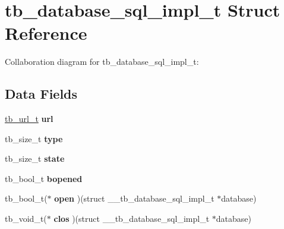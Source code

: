 \hypertarget{structtb__database__sql__impl__t}{\section{tb\-\_\-database\-\_\-sql\-\_\-impl\-\_\-t Struct Reference}
\label{structtb__database__sql__impl__t}
}


Collaboration diagram for tb\-\_\-database\-\_\-sql\-\_\-impl\-\_\-t\-:
\subsection*{Data Fields}
\begin{DoxyCompactItemize}
\item 
\hypertarget{structtb__database__sql__impl__t_acbc34a4600fe6223cdf4aa08bb3df7ce}{\hyperlink{structtb__url__t}{tb\-\_\-url\-\_\-t} {\bfseries url}}\label{structtb__database__sql__impl__t_acbc34a4600fe6223cdf4aa08bb3df7ce}

\item 
\hypertarget{structtb__database__sql__impl__t_ac3a776c88e0ed0d1ba9ca92743af5d33}{tb\-\_\-size\-\_\-t {\bfseries type}}\label{structtb__database__sql__impl__t_ac3a776c88e0ed0d1ba9ca92743af5d33}

\item 
\hypertarget{structtb__database__sql__impl__t_ad51a1819a391ff588ae2350f78cd7946}{tb\-\_\-size\-\_\-t {\bfseries state}}\label{structtb__database__sql__impl__t_ad51a1819a391ff588ae2350f78cd7946}

\item 
\hypertarget{structtb__database__sql__impl__t_ac13557c348a2c60c2f135dbca17615bc}{tb\-\_\-bool\-\_\-t {\bfseries bopened}}\label{structtb__database__sql__impl__t_ac13557c348a2c60c2f135dbca17615bc}

\item 
\hypertarget{structtb__database__sql__impl__t_a39899ed9e152ec592825954296031928}{tb\-\_\-bool\-\_\-t($\ast$ {\bfseries open} )(struct \-\_\-\-\_\-tb\-\_\-database\-\_\-sql\-\_\-impl\-\_\-t $\ast$database)}\label{structtb__database__sql__impl__t_a39899ed9e152ec592825954296031928}

\item 
\hypertarget{structtb__database__sql__impl__t_ad15a39038cb8143b1b638a168ab3f92e}{tb\-\_\-void\-\_\-t($\ast$ {\bfseries clos} )(struct \-\_\-\-\_\-tb\-\_\-database\-\_\-sql\-\_\-impl\-\_\-t $\ast$database)}\label{structtb__database__sql__impl__t_ad15a39038cb8143b1b638a168ab3f92e}


\end{DoxyCompactItemize}
